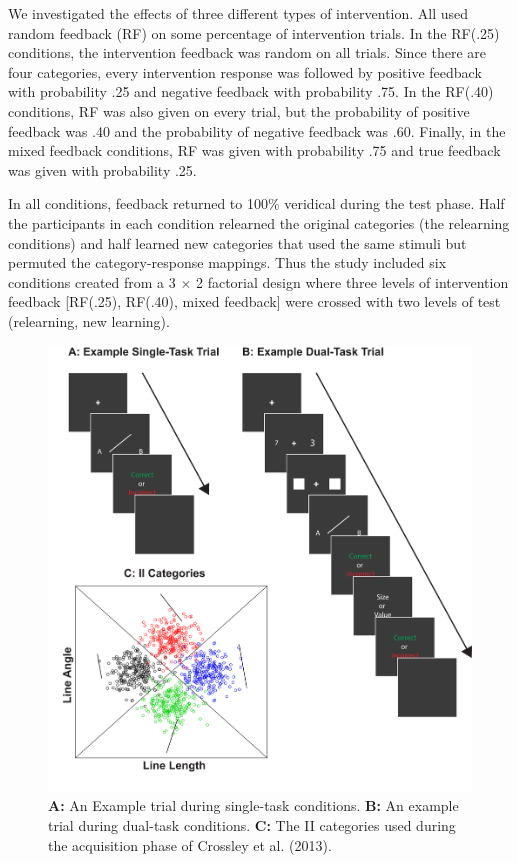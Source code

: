 \documentclass[apacite,draftfirst,man]{apa6}
\begin{document}
We investigated the effects of three different types of intervention. All used
random feedback (RF) on some percentage of intervention trials. In the RF(.25)
conditions, the intervention feedback was random on all trials. Since there are
four categories, every intervention response was followed by positive feedback
with probability .25 and negative feedback with probability .75. In the RF(.40)
conditions, RF was also given on every trial, but the probability of positive
feedback was .40 and the probability of negative feedback was .60. Finally, in
the mixed feedback conditions, RF was given with probability .75 and true
feedback was given with probability .25.

In all conditions, feedback returned to 100\% veridical during the test phase.
Half the participants in each condition relearned the original categories (the
relearning conditions) and half learned new categories that used the same
stimuli but permuted the category-response mappings. Thus the study included six
conditions created from a 3 $\times$ 2 factorial design where three levels of
intervention feedback [RF(.25), RF(.40), mixed feedback] were crossed with two
levels of test (relearning, new learning).

\begin{figure}[t]
\centering \includegraphics[width=1.0\textwidth]{../figures/fig_trials.pdf}
  \caption{ \textbf{A:} An Example trial during single-task conditions.
\textbf{B:} An example trial during dual-task conditions. \textbf{C:} The II
categories used during the acquisition phase of Crossley et al. (2013). }
  \label{fig:test_cats}
\end{figure}
\end{document}
